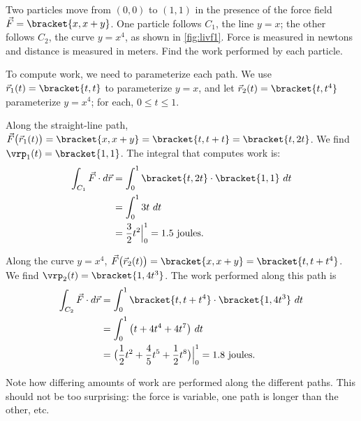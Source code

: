 {Two particles move from $(0,0)$ to $(1,1)$ in the presence of the force field $\vec F  =\bracket{x,x+y}$. One particle follows $C_1$, the line $y=x$; the other follows $C_2$, the curve $y=x^4$, as shown in \autoref{fig:livf1}. Force is measured in newtons and distance is measured in meters. Find the work performed by each particle.}
{To compute work, we need to parameterize each path. We use $\vec r_1(t) =\bracket{t,t}$ to parameterize $y=x$, and let $\vec r_2(t) =\bracket{t,t^4}$ parameterize $y=x^4$; for each, $0\leq t\leq 1$. 

Along the straight-line path, $\vec F\big(\vec r_1(t)\big) =\bracket{x,x+y}=\bracket{t,t+t}=\bracket{t,2t}$. We find $\vrp_1(t) =\bracket{1,1}$. The integral that computes work is:
\begin{align*}
	\int_{C_1} \vec F\cdot d\vec r
	&= \int_0^1\bracket{t,2t}\cdot\bracket{1,1}\ dt \\
	&= \int_0^1 3t\ dt \\
	&= \frac32t^2\Big|_0^1 = 1.5 \text{ joules}.
\end{align*}

Along the curve $y = x^4$, $\vec F\big(\vec r_2(t)\big) =\bracket{x,x+y}=\bracket{t,t+t^4}$. We find $\vrp_2(t) =\bracket{1,4t^3}$. The work performed along this path is
\begin{align*}
	\int_{C_2} \vec F\cdot d\vec r
	&= \int_0^1\bracket{t,t+t^4}\cdot\bracket{1,4t^3}\ dt\\
	&= \int_0^1 \big(t + 4t^4+ 4t^7\big)\ dt \\
	&= \big(\frac12t^2 + \frac45t^5 + \frac12t^8\big)\Big|_0^1 =  1.8 \text{ joules}.
\end{align*}

Note how differing amounts of work are performed along the different paths. This should not be too surprising: the force is variable, one path is longer than the other, etc.}


